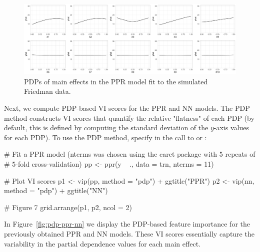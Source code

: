 
\begin{figure}[!htb]
  \centering 
  \includegraphics[width=1\linewidth]{figures/pdp-ppr} 
  \caption{PDPs of main effects in the PPR model fit to the simulated Friedman data.}
  \label{fig:pdp-ppr}
\end{figure}

Next, we compute PDP-based VI scores for the PPR and NN models. The PDP method constructs VI scores that quantify the relative "flatness" of each PDP (by default, this is defined by computing the standard deviation of the $y$-axis values for each PDP). To use the PDP method, specify  in the call to  or :

\begin{example}
# Fit a PPR model (nterms was chosen using the caret package with 5 repeats of 
# 5-fold cross-validation)
pp <- ppr(y ~ ., data = trn, nterms = 11)  

# Plot VI scores
p1 <- vip(pp, method = "pdp") + ggtitle("PPR")
p2 <- vip(nn, method = "pdp") + ggtitle("NN")

# Figure 7
grid.arrange(p1, p2, ncol = 2)
\end{example}

In Figure~\ref{fig:pdp-ppr-nn} we display the PDP-based feature importance for the previously obtained PPR and NN models. These VI scores essentially capture the variability in the partial dependence values for each main effect.


